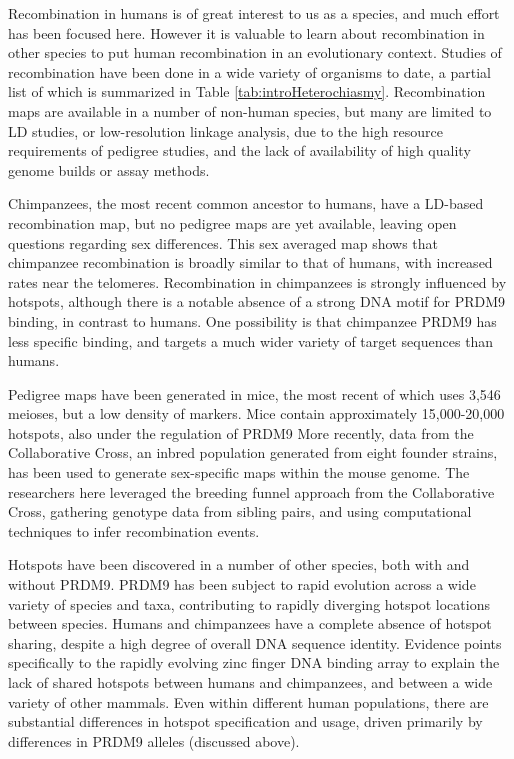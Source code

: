 Recombination in humans is of great interest to us as a species, and much effort has been focused here.
However it is valuable to learn about recombination in other species to put human recombination in an evolutionary context.
Studies of recombination have been done in a wide variety of organisms to date, a partial list of which is summarized in Table \ref{tab:introHeterochiasmy}.
Recombination maps are available in a number of non-human species, but many are limited to LD studies, or low-resolution linkage analysis, due to the high resource requirements of pedigree studies, and the lack of availability of high quality genome builds or assay methods.

Chimpanzees, the most recent common ancestor to humans, have a LD-based recombination map\cite{Auton2012a}, but no pedigree maps are yet available, leaving open questions regarding sex differences.
This sex averaged map shows that chimpanzee recombination is broadly similar to that of humans, with increased rates near the telomeres.
Recombination in chimpanzees is strongly influenced by hotspots, although there is a notable absence of a strong DNA motif for PRDM9 binding, in contrast to humans\cite{Auton2012a}.
One possibility is that chimpanzee PRDM9 has less specific binding, and targets a much wider variety of target sequences than humans.

Pedigree maps have been generated in mice\cite{Broman2002}, the most recent of which uses 3,546 meioses, but a low density of markers\cite{Cox2009}.
Mice contain approximately 15,000-20,000 hotspots, also under the regulation of PRDM9\cite{Brick2012,Smagulova2011}
More recently, data from the Collaborative Cross\cite{CollaborativeCrossConsortium2012}, an inbred population generated from eight founder strains, has been used to generate sex-specific maps within the mouse genome\cite{Liu2014}.
The researchers here leveraged the breeding funnel approach from the Collaborative Cross, gathering genotype data from sibling pairs, and using computational techniques to infer recombination events.

Hotspots have been discovered in a number of other species, both with and without PRDM9.
PRDM9 has been subject to rapid evolution across a wide variety of species and taxa, contributing to rapidly diverging hotspot locations between species\cite{Oliver2009,Ponting2011}.
Humans and chimpanzees have a complete absence of hotspot sharing, despite a high degree of overall DNA sequence identity\cite{Ptak2005,Winckler2005,Auton2012a}.
Evidence points specifically to the rapidly evolving zinc finger DNA binding array to explain the lack of shared hotspots between humans and chimpanzees\cite{Myers2010}, and between a wide variety of other mammals\cite{Oliver2009,Ponting2011,Thomas2009}.
Even within different human populations, there are substantial differences in hotspot specification and usage, driven primarily by differences in PRDM9 alleles (discussed above).

